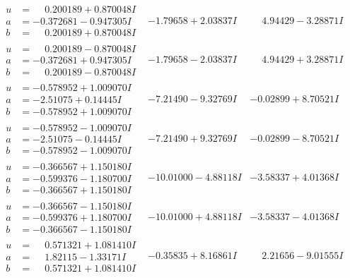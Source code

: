\documentclass[1p]{elsarticle_modified}
\theoremstyle{definition}
\begin{document}
$$\begin{array}{c|c|c}
\begin{aligned}
u &= \phantom{-}0.200189 + 0.870048 I \\
a &= -0.372681 - 0.947305 I \\
b &= \phantom{-}0.200189 + 0.870048 I\end{aligned}
 & -1.79658 + 2.03837 I & \phantom{-}4.94429 - 3.28871 I \\ \hline\begin{aligned}
u &= \phantom{-}0.200189 - 0.870048 I \\
a &= -0.372681 + 0.947305 I \\
b &= \phantom{-}0.200189 - 0.870048 I\end{aligned}
 & -1.79658 - 2.03837 I & \phantom{-}4.94429 + 3.28871 I \\ \hline\begin{aligned}
u &= -0.578952 + 1.009070 I \\
a &= -2.51075 + 0.14445 I \\
b &= -0.578952 + 1.009070 I\end{aligned}
 & -7.21490 - 9.32769 I & -0.02899 + 8.70521 I \\ \hline\begin{aligned}
u &= -0.578952 - 1.009070 I \\
a &= -2.51075 - 0.14445 I \\
b &= -0.578952 - 1.009070 I\end{aligned}
 & -7.21490 + 9.32769 I & -0.02899 - 8.70521 I \\ \hline\begin{aligned}
u &= -0.366567 + 1.150180 I \\
a &= -0.599376 - 1.180700 I \\
b &= -0.366567 + 1.150180 I\end{aligned}
 & -10.01000 - 4.88118 I & -3.58337 + 4.01368 I \\ \hline\begin{aligned}
u &= -0.366567 - 1.150180 I \\
a &= -0.599376 + 1.180700 I \\
b &= -0.366567 - 1.150180 I\end{aligned}
 & -10.01000 + 4.88118 I & -3.58337 - 4.01368 I \\ \hline\begin{aligned}
u &= \phantom{-}0.571321 + 1.081410 I \\
a &= \phantom{-}1.82115 - 1.33171 I \\
b &= \phantom{-}0.571321 + 1.081410 I\end{aligned}
 & -0.35835 + 8.16861 I & \phantom{-}2.21656 - 9.01555 I \\ \hline\begin{aligned}

\end{aligned}
\end{array}$$
\end{document}
